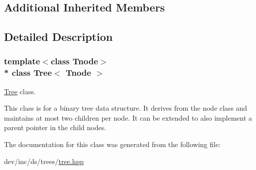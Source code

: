 \subsection*{Additional Inherited Members}


\subsection{Detailed Description}
\subsubsection*{template$<$class Tnode$>$\\*
class Tree$<$ Tnode $>$}

\hyperlink{classTree}{Tree} class. 

This class is for a binary tree data structure. It derives from the node class and maintains at most two children per node. It can be extended to also implement a parent pointer in the child nodes. 

The documentation for this class was generated from the following file\+:\begin{DoxyCompactItemize}
\item 
dev/inc/ds/trees/\hyperlink{tree_8hpp}{tree.\+hpp}\end{DoxyCompactItemize}
